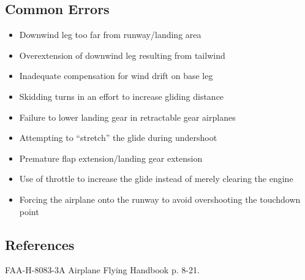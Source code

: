\subsection{Common Errors}

\begin{itemize}
  \item Downwind leg too far from runway/landing area
  \item Overextension of downwind leg resulting from tailwind
  \item Inadequate compensation for wind drift on base leg
  \item Skidding turns in an effort to increase gliding distance
  \item Failure to lower landing gear in retractable gear airplanes
  \item Attempting to ``stretch'' the glide during undershoot
  \item Premature flap extension/landing gear extension
  \item Use of throttle to increase the glide instead of merely clearing the
    engine
  \item Forcing the airplane onto the runway to avoid overshooting the
    touchdown point
\end{itemize}

\subsection{References}

FAA-H-8083-3A Airplane Flying Handbook p. 8-21.
